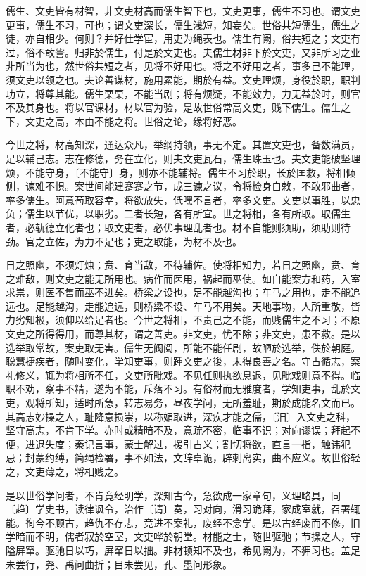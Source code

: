\documentclass[]{article}
\begin{document}
儒生、文吏皆有材智，非文吏材高而儒生智下也，文吏更事，儒生不习也。谓文吏更事，儒生不习，可也；谓文吏深长，儒生浅短，知妄矣。世俗共短儒生，儒生之徒，亦自相少。何则？并好仕学宦，用吏为绳表也。儒生有阙，俗共短之；文吏有过，俗不敢訾。归非於儒生，付是於文吏也。夫儒生材非下於文吏，又非所习之业非所当为也，然世俗共短之者，见将不好用也。将之不好用之者，事多己不能理，须文吏以领之也。夫论善谋材，施用累能，期於有益。文吏理烦，身役於职，职判功立，将尊其能。儒生栗栗，不能当剧；将有烦疑，不能效力，力无益於时，则官不及其身也。将以官课材，材以官为验，是故世俗常高文吏，贱下儒生。儒生之下，文吏之高，本由不能之将。世俗之论，缘将好恶。

今世之将，材高知深，通达众凡，举纲持领，事无不定。其置文吏也，备数满员，足以辅己志。志在修德，务在立化，则夫文吏瓦石，儒生珠玉也。夫文吏能破坚理烦，不能守身，〔不能守〕身，则亦不能辅将。儒生不习於职，长於匡救，将相倾侧，谏难不惧。案世间能建蹇蹇之节，成三谏之议，令将检身自敕，不敢邪曲者，率多儒生。阿意苟取容幸，将欲放失，低嘿不言者，率多文吏。文吏以事胜，以忠负；儒生以节优，以职劣。二者长短，各有所宜。世之将相，各有所取。取儒生者，必轨德立化者也；取文吏者，必优事理乱者也。材不自能则须助，须助则待劲。官之立佐，为力不足也；吏之取能，为材不及也。

日之照幽，不须灯烛；贲、育当敌，不待辅佐。使将相知力，若日之照幽，贲、育之难敌，则文吏之能无所用也。病作而医用，祸起而巫使。如自能案方和药，入室求祟，则医不售而巫不进矣。桥梁之设也，足不能越沟也；车马之用也，走不能追远也。足能越沟，走能追远，则桥梁不设、车马不用矣。天地事物，人所重敬，皆力劣知极，须仰以给足者也。今世之将相，不责己之不能，而贱儒生之不习；不原文吏之所得得用，而尊其材，谓之善吏。非文吏，忧不除；非文吏，患不救。是以选举取常故，案吏取无害。儒生无阀阅，所能不能任剧，故陋於选举，佚於朝庭。聪慧捷疾者，随时变化，学知吏事，则踵文吏之後，未得良善之名。守古循志，案礼修义，辄为将相所不任，文吏所毗戏。不见任则执欲息退，见毗戏则意不得。临职不劝，察事不精，遂为不能，斥落不习。有俗材而无雅度者，学知吏事，乱於文吏，观将所知，适时所急，转志易务，昼夜学问，无所羞耻，期於成能名文而已。其高志妙操之人，耻降意损崇，以称媚取进，深疾才能之儒，〔汨〕入文吏之科，坚守高志，不肯下学。亦时或精暗不及，意疏不密，临事不识；对向谬误；拜起不便，进退失度；秦记言事，蒙士解过，援引古义；割切将欲，直言一指，触讳犯忌；封蒙约缚，简绳检署，事不如法，文辞卓诡，辟刺离实，曲不应义。故世俗轻之，文吏薄之，将相贱之。

是以世俗学问者，不肯竟经明学，深知古今，急欲成一家章句，义理略具，同〔趋〕学史书，读律讽令，治作〔请〕奏，习对向，滑习跪拜，家成室就，召署辄能。徇今不顾古，趋仇不存志，竞进不案礼，废经不念学。是以古经废而不修，旧学暗而不明，儒者寂於空室，文吏哗於朝堂。材能之士，随世驱驰；节操之人，守隘屏窜。驱驰日以巧，屏窜日以拙。非材顿知不及也，希见阙为，不狎习也。盖足未尝行，尧、禹问曲折；目未尝见，孔、墨问形象。
\end{document}
